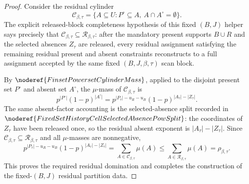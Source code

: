 \begin{proof}
Consider the residual cylinder
\[
\mathcal C_{\beta,\tau}
  =\{A\subseteq U: P^\circ\subseteq A,\ A\cap A^\circ=\emptyset\}.
\]
The explicit released-block completeness hypothesis of this fixed
\((B,J)\) helper says precisely that
\(\mathcal C_{\beta,\tau}\subseteq\mathcal R_{\beta,\tau}\): after the
mandatory present supports \(B\cup R\) and the selected absences \(Z_\tau\)
are released, every residual assignment satisfying the remaining residual
present and absent constraints reconstructs to a full assignment accepted by
the same fixed \((B,J,\beta,\tau)\) scan block.

By \(\noderef{FinsetPowersetCylinderMass}\), applied to the disjoint
present set \(P^\circ\) and absent set \(A^\circ\), the \(\mu\)-mass of
\(\mathcal C_{\beta,\tau}\) is
\[
p^{|P^\circ|}(1-p)^{|A^\circ|}
 =
p^{|P_\tau|-u_R-u_B}(1-p)^{|A_\tau|-|Z_\tau|}.
\]
The same absent-factor accounting is the selected-absence split recorded in
\(\noderef{FixedSetHistoryCellSelectedAbsencePowSplit}\): the coordinates
of \(Z_\tau\) have been released once, so the residual absent exponent is
\(|A_\tau|-|Z_\tau|\).  Since
\(\mathcal C_{\beta,\tau}\subseteq\mathcal R_{\beta,\tau}\) and all
\(\mu\)-masses are nonnegative,
\[
p^{|P_\tau|-u_R-u_B}(1-p)^{|A_\tau|-|Z_\tau|}
  =\sum_{A\in\mathcal C_{\beta,\tau}}\mu(A)
  \le \sum_{A\in\mathcal R_{\beta,\tau}}\mu(A)
  = \rho_{\beta,\tau}.
\]
This proves the required residual domination and completes the construction
of the fixed-\((B,J)\) residual partition data.
\end{proof}
